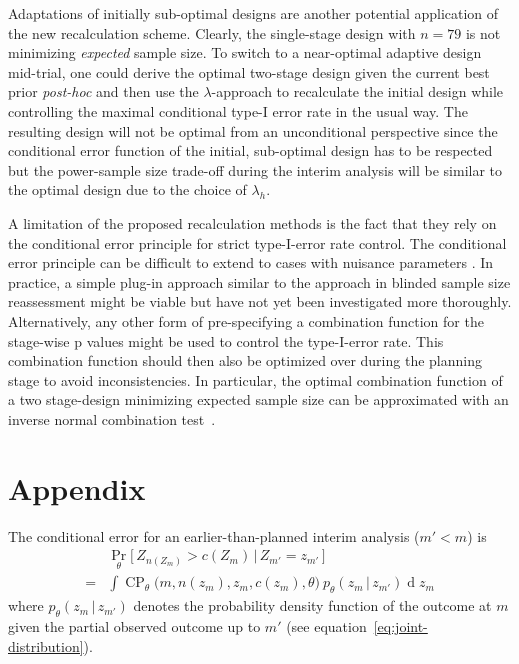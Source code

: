 \documentclass[12pt]{article}
\renewcommand{\Pr}{\operatorname{Pr}}
\newcommand{\CP}{\ensuremath{\operatorname{CP}}}
\renewcommand{\Pr}{\ensuremath{\operatorname{Pr}}}
\newcommand{\cond}{\ensuremath{\,|\,}}
\begin{document}
Adaptations of initially sub-optimal designs are another potential
application of the new recalculation scheme.
Clearly, the single-stage design with $n=79$ is not minimizing
\emph{expected} sample size.
To switch to a near-optimal adaptive design mid-trial,
one could derive the optimal two-stage design given the current best prior \textit{post-hoc} and
then use the $\lambda$-approach to recalculate the initial design while controlling the maximal
conditional type-I error rate in the usual way.
The resulting design will not be optimal from an unconditional perspective since the conditional error function of the initial, sub-optimal design has to be respected but the power-sample size trade-off during the interim analysis
will be similar to the optimal design due to the choice of $\lambda_h$.

A limitation of the proposed recalculation methods is the fact that they
rely on the conditional error principle for strict type-I-error rate control.
The conditional error principle can be difficult to extend to cases with nuisance
parameters \cite{gutjahr2011}.
In practice, a simple plug-in approach similar to the approach in blinded sample size reassessment might be viable but have not yet been investigated more thoroughly.
Alternatively, any other form of pre-specifying a combination function for the stage-wise p values might be used to control the type-I-error rate.
This combination function should then also be optimized over during the planning stage
to avoid inconsistencies.
In particular, the optimal combination function of a two stage-design minimizing expected sample size can be approximated with an inverse normal combination test~\cite{pilz2019}.







\section*{Appendix}

The conditional error for an earlier-than-planned interim analysis ($m'<m$)
is
\begin{align}
    & \Pr_\theta\big[\,Z_{n(Z_m)} > c(Z_m) \cond Z_{m'} = z_{m'}\,\big] \\
    =& \int \CP_\theta\big(m,n(z_m),z_m, c(z_m), \theta\big)\  p_\theta(z_m \cond z_{m'}) \operatorname{d} z_m
\end{align}
where $p_\theta(z_m \cond z_{m'})$ denotes the probability density function of the outcome at $m$ given the partial observed outcome up to $m'$ (see equation~\eqref{eq:joint-distribution}).
\end{document}
